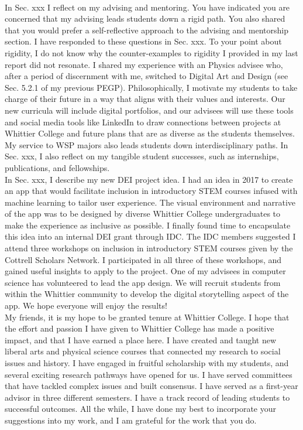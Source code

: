 \documentclass[../../main.tex]{subfiles}
\begin{document}
\\
\vspace{0.25cm}
In Sec. xxx I reflect on my advising and mentoring.  You have indicated you are concerned that my advising leads students down a rigid path.  You also shared that you would prefer a self-reflective approach to the advising and mentorship section.  I have responded to these questions in Sec. xxx.  To your point about rigidity, I do not know why the counter-examples to rigidity I provided in my last report did not resonate.  I shared my experience with an Physics advisee who, after a period of discernment with me, switched to Digital Art and Design (see Sec. 5.2.1 of my previous PEGP).  Philosophically, I motivate my students to take charge of their future in a way that aligns with their values and interests.  Our new curricula will include digital portfolios, and our advisees will use these tools and social media tools like LinkedIn to draw connections between projects at Whittier College and future plans that are as diverse as the students themselves.  My service to WSP majors also leads students down interdisciplinary paths.  In Sec. xxx, I also reflect on my tangible student successes, such as internships, publications, and fellowships.
\\
\vspace{0.25cm}
In Sec. xxx, I describe my new DEI project idea.  I had an idea in 2017 to create an app that would facilitate inclusion in introductory STEM courses infused with machine learning to tailor user experience.  The visual environment and narrative of the app was to be designed by diverse Whittier College undergraduates to make the experience as inclusive as possible.  I finally found time to encapsulate this idea into an internal DEI grant through IDC.  The IDC members suggested I attend three workshops on inclusion in introductory STEM courses given by the Cottrell Scholars Network.  I participated in all three of these workshops, and gained useful insights to apply to the project.  One of my advisees in computer science has volunteered to lead the app design.  We will recruit students from within the Whittier community to develop the digital storytelling aspect of the app.  We hope everyone will enjoy the results!
\\
\vspace{0.25cm}
My friends, it is my hope to be granted tenure at Whittier College.  I hope that the effort and passion I have given to Whittier College has made a positive impact, and that I have earned a place here.  I have created and taught new liberal arts and physical science courses that connected my research to social issues and history.  I have engaged in fruitful scholarship with my students, and several exciting research pathways have opened for us.  I have served committees that have tackled complex issues and built consensus.  I have served as a first-year advisor in three different semesters.  I have a track record of leading students to successful outcomes.  All the while, I have done my best to incorporate your suggestions into my work, and I am grateful for the work that you do.
\end{document}
